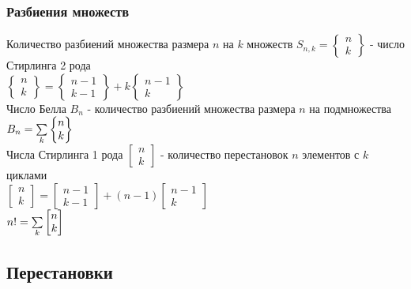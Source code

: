 \documentclass[12pt]{article}
\begin{document}
\subsubsection{Разбиения множеств}
Количество разбиений множества размера $n$ на $k$ множеств $S_{n,k} = \begin{Bmatrix} n\\k\end{Bmatrix}$ - число Стирлинга 2 рода\\
$\begin{Bmatrix} n\\k\end{Bmatrix} = \begin{Bmatrix} n-1\\k-1\end{Bmatrix} + k\begin{Bmatrix} n-1\\k\end{Bmatrix}$\\
Число Белла $B_n$ - количество разбиений множества размера $n$ на подмножества\\
$B_n = \sum\limits_{k}\begin{Bmatrix} n\\k\end{Bmatrix}$\\
Числа Стирлинга 1 рода $\begin{bmatrix} n\\k\end{bmatrix}$ - количество перестановок $n$ элементов с $k$ циклами\\
$\begin{bmatrix} n\\k\end{bmatrix} = \begin{bmatrix} n-1\\k-1\end{bmatrix} + (n-1)\begin{bmatrix} n-1\\k\end{bmatrix}$\\
$n! = \sum\limits_{k}\begin{bmatrix} n\\k\end{bmatrix}$
\subsection{Перестановки}
\end{document}
